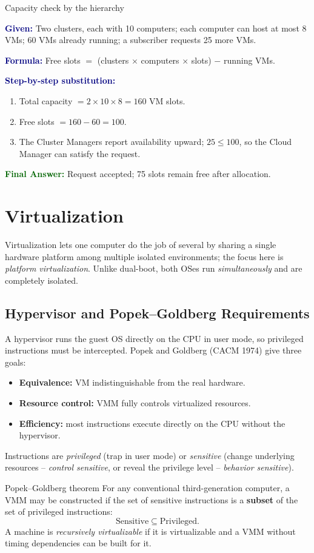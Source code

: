 \documentclass[11pt,a4paper,openany]{report}
\newcommand{\Given}{\par\textbf{\textcolor{navy}{Given:}} }
\newcommand{\Formula}{\par\textbf{\textcolor{navy}{Formula:}} }
\newcommand{\Steps}{\par\textbf{\textcolor{navy}{Step-by-step substitution:}}\par}
\newcommand{\Answer}{\par\textbf{\textcolor{darkgreen}{Final Answer:}} }
\begin{document}
\begin{solved}{Capacity check by the hierarchy}
\Given Two clusters, each with 10 computers; each computer can host at most 8 VMs; 60 VMs already running; a subscriber requests 25 more VMs.
\Formula Free slots $=$ (clusters $\times$ computers $\times$ slots) $-$ running VMs.
\Steps
\begin{enumerate}[leftmargin=*]
  \item Total capacity $= 2 \times 10 \times 8 = 160$ VM slots.
  \item Free slots $= 160 - 60 = 100$.
  \item The Cluster Managers report availability upward; $25 \le 100$, so the Cloud Manager can satisfy the request.
\end{enumerate}
\Answer Request accepted; 75 slots remain free after allocation.
\end{solved}

\section{Virtualization}
Virtualization lets one computer do the job of several by sharing a single hardware platform among multiple
isolated environments; the focus here is \emph{platform virtualization}. Unlike dual-boot, both OSes run
\emph{simultaneously} and are completely isolated.

\subsection{Hypervisor and Popek--Goldberg Requirements}
A hypervisor runs the guest OS directly on the CPU in user mode, so privileged instructions must be
intercepted. Popek and Goldberg (CACM 1974) give three goals:
\begin{itemize}[leftmargin=*]
  \item \textbf{Equivalence:} VM indistinguishable from the real hardware.
  \item \textbf{Resource control:} VMM fully controls virtualized resources.
  \item \textbf{Efficiency:} most instructions execute directly on the CPU without the hypervisor.
\end{itemize}
Instructions are \emph{privileged} (trap in user mode) or \emph{sensitive} (change underlying resources --
\emph{control sensitive}, or reveal the privilege level -- \emph{behavior sensitive}).

\begin{thmbox}{Popek--Goldberg theorem}
For any conventional third-generation computer, a VMM may be constructed if the set of sensitive
instructions is a \textbf{subset} of the set of privileged instructions:
\[ \text{Sensitive} \subseteq \text{Privileged}. \]
A machine is \emph{recursively virtualizable} if it is virtualizable and a VMM without timing dependencies
can be built for it.
\end{thmbox}
\end{document}
